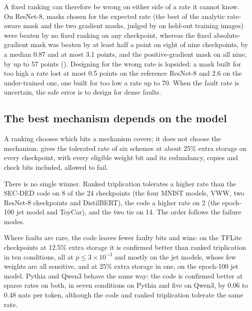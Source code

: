 A fixed ranking can therefore be wrong on either side of a rate it cannot know. On ResNet-8, masks chosen for the expected rate (the best of the analytic rate-aware mask and the two gradient masks, judged by  on held-out training images) were beaten by no fixed ranking on any checkpoint, whereas the fixed absolute-gradient mask was beaten by at least half a point on eight of nine checkpoints, by a median 0.87 and at most 3.1 points, and the positive-gradient mask on all nine, by up to 57 points (). Designing for the wrong rate is lopsided: a mask built for too high a rate lost at most 0.5 points on the reference ResNet-8 and 2.6 on the under-trained one, one built for too low a rate up to 70. When the fault rate is uncertain, the safe error is to design for dense faults.

\subsection{The best mechanism depends on the model}\label{sec:correction}
A ranking chooses which bits a mechanism covers; it does not choose the mechanism.  gives the tolerated rate of six schemes at about 25\% extra storage on every checkpoint, with every eligible weight bit and its redundancy, copies and check bits included, allowed to fail.

There is no single winner. Ranked triplication tolerates a higher rate than the SEC-DED code on 8 of the 24 checkpoints (the four MNIST models, VWW, two ResNet-8 checkpoints and DistilBERT), the code a higher rate on 2 (the epoch-100 jet model and ToyCar), and the two tie on 14. The order follows the failure modes.

Where faults are rare, the code leaves fewer faulty bits and wins: on the TFLite checkpoints at 12.5\% extra storage it is confirmed better than ranked triplication in ten conditions, all at $p\le3\times10^{-3}$ and mostly on the jet models, whose few weights are all sensitive, and at 25\% extra storage in one, on the epoch-100 jet model. Pythia and Qwen3 behave the same way: the code is confirmed better at sparse rates on both, in seven conditions on Pythia and five on Qwen3, by 0.06 to 0.48 nats per token, although the code and ranked triplication tolerate the same rate.

